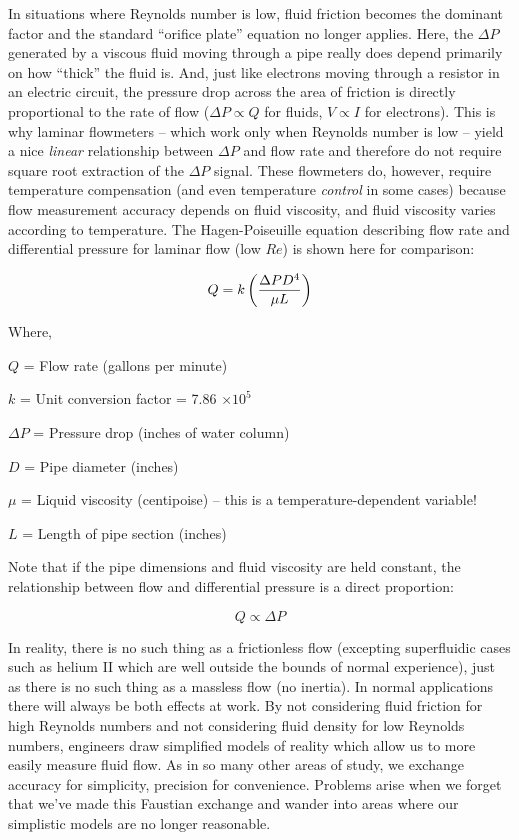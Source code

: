 In situations where Reynolds number is low, fluid friction becomes the dominant factor and the standard ``orifice plate'' equation no longer applies.  Here, the $\Delta P$ generated by a viscous fluid moving through a pipe really does depend primarily on how ``thick'' the fluid is.  And, just like electrons moving through a resistor in an electric circuit, the pressure drop across the area of friction is directly proportional to the rate of flow ($\Delta P \propto Q$ for fluids, $V \propto I$ for electrons).  This is why laminar flowmeters -- which work only when Reynolds number is low -- yield a nice \textit{linear} relationship between $\Delta P$ and flow rate and therefore do not require square root extraction of the $\Delta P$ signal.  These flowmeters do, however, require temperature compensation (and even temperature \textit{control} in some cases) because flow measurement accuracy depends on fluid viscosity, and fluid viscosity varies according to temperature.  The Hagen-Poiseuille equation describing flow rate and differential pressure for laminar flow (low $Re$) is shown here for comparison:    

$$Q = k \left({{\Delta P D^4} \over {\mu L}}\right)$$

\noindent
Where,

$Q$ = Flow rate (gallons per minute)

$k$ = Unit conversion factor = 7.86 $\times 10^5$

$\Delta P$ = Pressure drop (inches of water column)

$D$ = Pipe diameter (inches)

$\mu$ = Liquid viscosity (centipoise) -- this is a temperature-dependent variable!

$L$ = Length of pipe section (inches)

\vskip 10pt

Note that if the pipe dimensions and fluid viscosity are held constant, the relationship between flow and differential pressure is a direct proportion:

$$Q \propto \Delta P$$

In reality, there is no such thing as a frictionless flow (excepting superfluidic cases such as helium II which are well outside the bounds of normal experience), just as there is no such thing as a massless flow (no inertia).  In normal applications there will always be both effects at work.  By not considering fluid friction for high Reynolds numbers and not considering fluid density for low Reynolds numbers, engineers draw simplified models of reality which allow us to more easily measure fluid flow.  As in so many other areas of study, we exchange accuracy for simplicity, precision for convenience.  Problems arise when we forget that we've made this Faustian exchange and wander into areas where our simplistic models are no longer reasonable.

